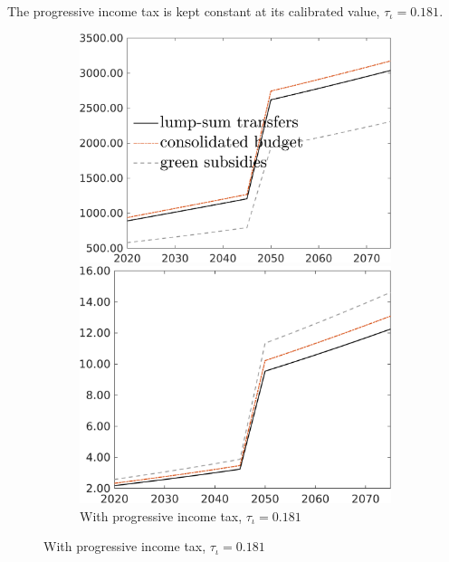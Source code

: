 The progressive income tax is kept constant at its calibrated value, $\tau_{\iota}=0.181$. 
\begin{figure}[h!!]
	\caption{Necessary carbon tax by policy regime}\label{fig:regs}
\begin{subfigure}{0.9\textwidth}
	\centering
	\caption{ With progressive income tax, $\tau_{\iota}=0.181$}
	\begin{minipage}[]{0.32\textwidth}
		\includegraphics[width=1\textwidth]{../../codding_model/own_basedOnFried/optimalPol_010922_revision/figures/all_13Sept22/CompRed_TaulCalib_Tauf_spillover0_knspil0_nsk0_xgr0_sep0_LFlimit1_emsbase0_countec0_GovRev0_etaa0.79_lgd1.png}
	\end{minipage}
\begin{minipage}[]{0.32\textwidth}
\includegraphics[width=1\textwidth]{../../codding_model/own_basedOnFried/optimalPol_010922_revision/figures/all_13Sept22/CompRed_TaulCalib_GFF_spillover0_knspil0_nsk0_xgr0_sep0_LFlimit1_emsbase0_countec0_GovRev0_etaa0.79_lgd0.png}

\end{minipage}
\end{subfigure}
\end{figure}
